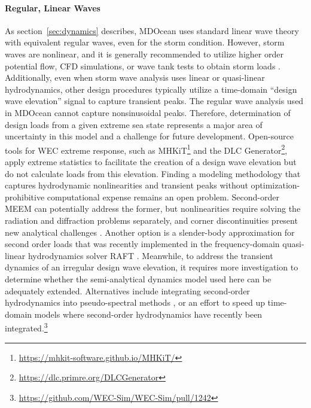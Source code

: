 \paragraph{Regular, Linear Waves}
As section~\ref{sec:dynamics} describes, MDOcean uses standard linear wave theory with equivalent regular waves, even for the storm condition.
However, storm waves are nonlinear, and it is generally recommended to utilize higher order potential flow, CFD simulations, or wave tank tests to obtain storm loads \cite{coe_survey_2018}.
Additionally, even when storm wave analysis uses linear or quasi-linear hydrodynamics, other design procedures typically utilize a time-domain ``design wave elevation'' signal to capture transient peaks.
The regular wave analysis used in MDOcean cannot capture nonsinusoidal peaks.
Therefore, determination of design loads from a given extreme sea state represents a major area of uncertainty in this model and a challenge for future development.
Open-source tools for WEC extreme response, such as MHKiT\footnote{\url{https://mhkit-software.github.io/MHKiT/}} and the DLC Generator\footnote{\url{https://dlc.primre.org/DLCGenerator}}, apply extreme statistics to facilitate the creation of a design wave elevation but do not calculate loads from this elevation.
Finding a modeling methodology that captures hydrodynamic nonlinearities and transient peaks without optimization-prohibitive computational expense remains an open problem.
Second-order MEEM can potentially address the former, but nonlinearities require solving the radiation and diffraction problems separately, and corner discontinuities present new analytical challenges \cite{cong_novel_2020,mavrakos_second-order_2009}.
Another option is a slender-body approximation for second order loads that was recently implemented in the frequency-domain quasi-linear hydrodynamics solver RAFT \cite{carmo_slender-body_2025}.
Meanwhile, to address the transient dynamics of an irregular design wave elevation, it requires more investigation to determine whether the semi-analytical dynamics model used here can be adequately extended.
Alternatives include integrating second-order hydrodynamics into pseudo-spectral methods \cite{coe_initial_2020}, or an effort to speed up time-domain models where second-order hydrodynamics have recently been integrated.\footnote{\url{https://github.com/WEC-Sim/WEC-Sim/pull/1242}}

